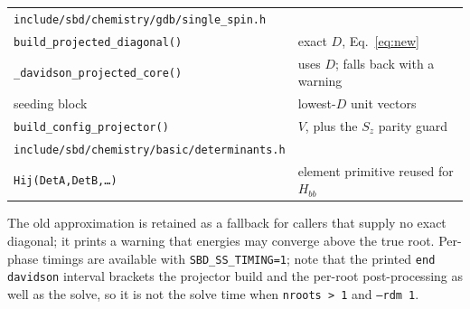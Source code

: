 \documentclass[11pt,a4paper]{article}
\newcommand{\code}[1]{\texttt{\small #1}}
\begin{document}
\begin{center}
\begin{tabular}{@{}ll@{}}
\toprule
\code{include/sbd/chemistry/gdb/single\_spin.h} & \\
\quad \code{build\_projected\_diagonal()} & exact $D$, Eq.~\eqref{eq:new} \\
\quad \code{\_davidson\_projected\_core()}  & uses $D$; falls back with a warning \\
\quad seeding block                         & lowest-$D$ unit vectors \\
\quad \code{build\_config\_projector()}     & $V$, plus the $S_z$ parity guard \\
\addlinespace
\code{include/sbd/chemistry/basic/determinants.h} & \\
\quad \code{Hij(DetA,DetB,\dots)}           & element primitive reused for $H_{bb}$ \\
\bottomrule
\end{tabular}
\end{center}

\noindent
The old approximation is retained as a fallback for callers that supply no
exact diagonal; it prints a warning that energies may converge above the true
root. Per-phase timings are available with \code{SBD\_SS\_TIMING=1}; note that
the printed \code{end davidson} interval brackets the projector build and the
per-root post-processing as well as the solve, so it is not the solve time
when \code{nroots > 1} and \code{--rdm 1}.
\end{document}

